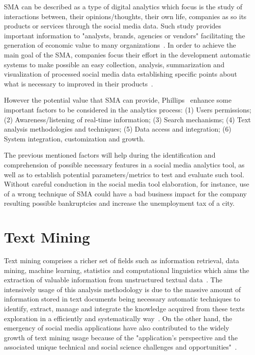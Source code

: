 \gls{SMA} can be described as a type of digital analytics which focus is the study of interactions between, their opinions/thoughts, their own life, companies as so its products or services through the social media data. Such study provides important information to "analysts, brands, agencies or vendors" facilitating the generation of economic value to many organizations~\cite{kn:Judah2012}. In order to achieve the main goal of the \gls{SMA}, companies focus their effort in the development automatic systems to make possible an easy collection, analysis, summarization and visualization of processed social media data establishing specific points about what is necessary to improved in their products~\cite{zeng2010social}.

However the potential value that \gls{SMA} can provide, Phillips~\cite{kn:Judah2012} enhance some important factors to be considered in the analytics process: (1) Users permissions; (2) Awareness/listening of real-time information; (3) Search mechanisms; (4) Text analysis methodologies and techniques; (5) Data access and integration; (6) System integration, customization and growth.

The previous mentioned factors will help during the identification and comprehension of possible necessary features in a social media analytics tool, as well as to establish potential parameters/metrics to test and evaluate such tool. Without careful conduction in the social media tool elaboration, for instance, use of a wrong technique of \gls{SMA} could have a bad business impact for the company resulting possible bankruptcies and increase the unemployment tax of a city.


\section{Text Mining}

Text mining comprises a richer set of fields such as information retrieval, data mining, machine learning, statistics and computational linguistics which aims the extraction of valuable information from unstructured textual data~\cite{kn:He2013}. The intensively usage of this analysis methodology is due to the massive amount of information stored in text documents being necessary automatic techniques to identify, extract, manage and integrate the knowledge acquired from these texts exploration in a efficiently and systematically way~\cite{ananiadou2015textmining}. On the other hand, the emergency of social media applications have also contributed to the widely growth of text mining usage because of the "application’s perspective and the associated unique technical and social science challenges and opportunities"~\cite{zeng2010social}.

